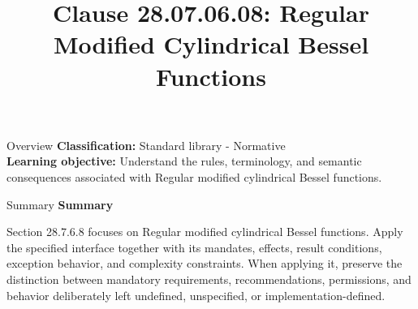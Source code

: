 \documentclass[10pt,letterpaper]{article}
\title{Clause 28.07.06.08: Regular Modified Cylindrical Bessel Functions}
\author{}
\date{}
\begin{document}
\maketitle
\begin{CornellOverviewBox}{Overview}
\textbf{Classification:} Standard library - Normative\\[2pt]
\textbf{Learning objective:} Understand the rules, terminology, and semantic consequences associated with Regular modified cylindrical Bessel functions.
\end{CornellOverviewBox}\begin{CornellSummaryBox}{Summary}
{\sffamily\bfseries\color{Accent} Summary}\par\vspace{3pt}Section 28.7.6.8 focuses on Regular modified cylindrical Bessel functions. Apply the specified interface together with its mandates, effects, result conditions, exception behavior, and complexity constraints. When applying it, preserve the distinction between mandatory requirements, recommendations, permissions, and behavior deliberately left undefined, unspecified, or implementation-defined.
\end{CornellSummaryBox}
\end{document}
